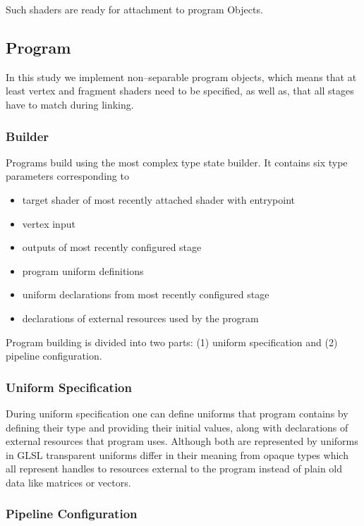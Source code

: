 Such shaders are ready for attachment to program Objects.

\subsection{Program}

In this study we implement non--separable program objects, which means that at least vertex and fragment shaders need to be specified, as well as, that all stages have to match during linking.

\subsubsection{Builder}

Programs build using the most complex type state builder. It contains six type parameters corresponding to
\begin{itemize}
    \item target shader of most recently attached shader with entrypoint
    \item vertex input
    \item outputs of most recently configured stage
    \item program uniform definitions
    \item uniform declarations from most recently configured stage
    \item declarations of external resources used by the program
\end{itemize}

Program building is divided into two parts: (1) uniform specification and (2) pipeline configuration.


\subsubsection{Uniform Specification}

During uniform specification one can define uniforms that program contains by defining their type and providing their initial values, along with declarations of external resources that program uses.
Although both are represented by uniforms in GLSL transparent uniforms differ in their meaning from opaque types which all represent handles to resources external to the program
instead of plain old data like matrices or vectors.

\subsubsection{Pipeline Configuration}

